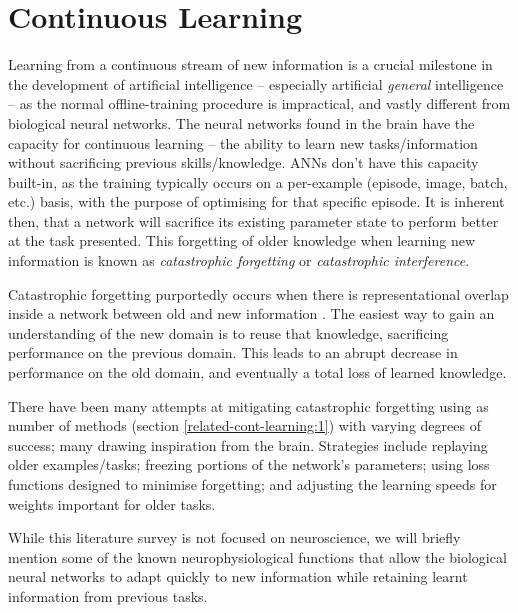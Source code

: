 \documentclass{report}
\begin{document}
\section{Continuous Learning}
Learning from a continuous stream of new information is a crucial milestone in the development of artificial intelligence -- especially artificial \emph{general} intelligence -- as the normal offline-training procedure is impractical, and vastly different from biological neural networks. The neural networks found in the brain have the capacity for continuous learning -- the ability to learn new tasks/information without sacrificing previous skills/knowledge. ANNs don't have this capacity built-in, as the training typically occurs on a per-example (episode, image, batch, etc.) basis, with the purpose of optimising for that specific episode. It is inherent then, that a network will sacrifice its existing parameter state to perform better at the task presented. This forgetting of older knowledge when learning new information is known as \textit{catastrophic forgetting} or \textit{catastrophic interference}. \par
Catastrophic forgetting purportedly occurs when there is representational overlap inside a network between old and new information \parencite{hat}. The easiest way to gain an understanding of the new domain is to reuse that knowledge, sacrificing performance on the previous domain. This leads to an abrupt decrease in performance on the old domain, and eventually a total loss of learned knowledge. \par
There have been many attempts at mitigating catastrophic forgetting using as number of methods (section \ref{related-cont-learning:1}) with varying degrees of success; many drawing inspiration from the brain. Strategies include replaying older examples/tasks; freezing portions of the network's parameters; using loss functions designed to minimise forgetting; and adjusting the learning speeds for weights important for older tasks. \par
While this literature survey is not focused on neuroscience, we will briefly mention some of the known neurophysiological functions that allow the biological neural networks to adapt quickly to new information while retaining learnt information from previous tasks. \par
\end{document}
